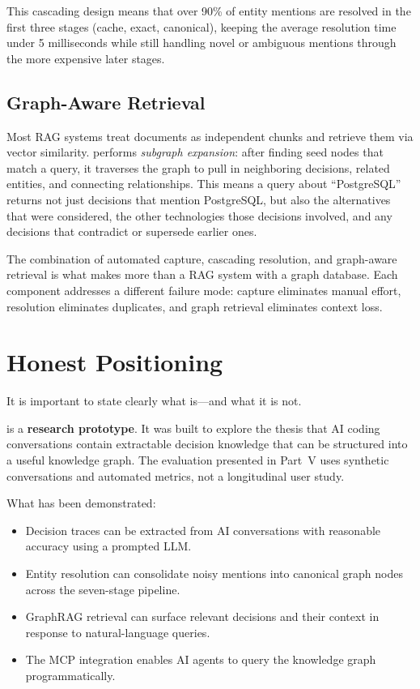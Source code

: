 This cascading design means that over 90\% of entity mentions are resolved in
the first three stages (cache, exact, canonical), keeping the average
resolution time under 5 milliseconds while still handling novel or ambiguous
mentions through the more expensive later stages.

\subsection{Graph-Aware Retrieval}

Most RAG systems treat documents as independent chunks and retrieve them via
vector similarity.  \sysname{} performs \emph{subgraph expansion}: after
finding seed nodes that match a query, it traverses the graph to pull in
neighboring decisions, related entities, and connecting relationships.  This
means a query about ``PostgreSQL'' returns not just decisions that mention
PostgreSQL, but also the alternatives that were considered, the other
technologies those decisions involved, and any decisions that contradict or
supersede earlier ones.

\begin{keyinsight}
The combination of automated capture, cascading resolution, and graph-aware
retrieval is what makes \sysname{} more than a RAG system with a graph
database.  Each component addresses a different failure mode: capture
eliminates manual effort, resolution eliminates duplicates, and graph retrieval
eliminates context loss.
\end{keyinsight}


\section{Honest Positioning}
\label{sec:honest-positioning}

It is important to state clearly what \sysname{} is---and what it is not.

\sysname{} is a \textbf{research prototype}.  It was built to explore the
thesis that AI coding conversations contain extractable decision knowledge that
can be structured into a useful knowledge graph.  The evaluation presented in
Part~V uses synthetic conversations and automated metrics, not a longitudinal
user study.

What has been demonstrated:

\begin{itemize}
    \item Decision traces can be extracted from AI conversations with
          reasonable accuracy using a prompted LLM.
    \item Entity resolution can consolidate noisy mentions into canonical graph
          nodes across the seven-stage pipeline.
    \item GraphRAG retrieval can surface relevant decisions and their context
          in response to natural-language queries.
    \item The MCP integration enables AI agents to query the knowledge graph
          programmatically.
\end{itemize}

